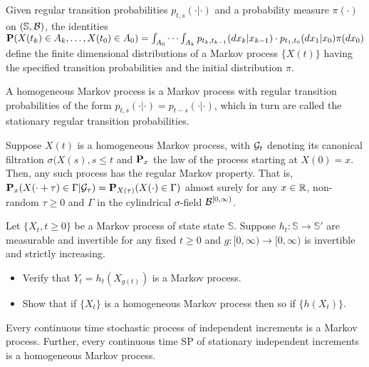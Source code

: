 \begin{theorem*} 
Given regular transition probabilities $p_{t, s}(\cdot | \cdot)$ and a
probability measure $\pi(\cdot)$ on $(\mathbb{S}, \mathcal{B})$, the identities
$\mathbf{P}(X(t_k) \in A_k, \dots, X(t_0) \in A_0) = \int_{A_0} \cdots \int_{A_k}
p_{t_k, t_{k-1}} (dx_k | x_{k-1}) \cdot p_{t_1, t_0} (dx_1 | x_0) \pi (dx_0)$
define the finite dimensional distributions of a Markov process $\{X(t)\}$
having the specified transition probabilities and the initial distribution
$\pi$.
\end{theorem*} 

\begin{definition*} 
A homogeneous Markov process is a Markov process with regular transition
probabilities of the form $p_{t, s} (\cdot | \cdot) = p_{t-s} (\cdot | \cdot)$,
which in turn are called the stationary regular transition probabilities.
\end{definition*} 

\begin{proposition*} 
Suppose $X(t)$ is a homogeneous Markov process, with $\mathcal{G}_t$ denoting its
canonical filtration $\sigma(X(s), s \le t$ and $\mathbf{P}_x$ the law of the process
starting at $X(0) = x$. Then, any such process has the regular Markov property.
That is, $\mathbf{P}_x(X(\cdot + \tau) \in \Gamma | \mathcal{G}_\tau) = \mathbf{P}_{X(\tau)} (X(\cdot)
\in \Gamma)$ almost surely for any $x \in \mathbb{R}$, non-random $\tau \ge 0$ and
$\Gamma$ in the cylindrical $\sigma$-field $\mathcal{B}^{[0, \infty)}$.
\end{proposition*} 

\begin{exercise*} 
Let $\{X_t, t \ge 0\}$ be a Markov process of state state $\mathbb{S}$. Suppose
$h_t: \mathbb{S} \rightarrow \mathbb{S}'$ are measurable and invertible for any
fixed $t \ge 0$ and $g: [0, \infty) \rightarrow [0, \infty)$ is invertible and
strictly increasing.
\begin{itemize}
\item Verify that $Y_t = h_t(X_{g(t)})$ is a Markov process.
\item Show that if $\{X_t\}$ is a homogeneous Markov process then so if
$\{h(X_t)\}$.
\end{itemize}
\end{exercise*} 

\begin{proposition*} 
Every continuous time stochastic process of independent increments is a Markov
process. Further, every continuous time SP of stationary independent increments
is a homogeneous Markov process.
\end{proposition*} 

